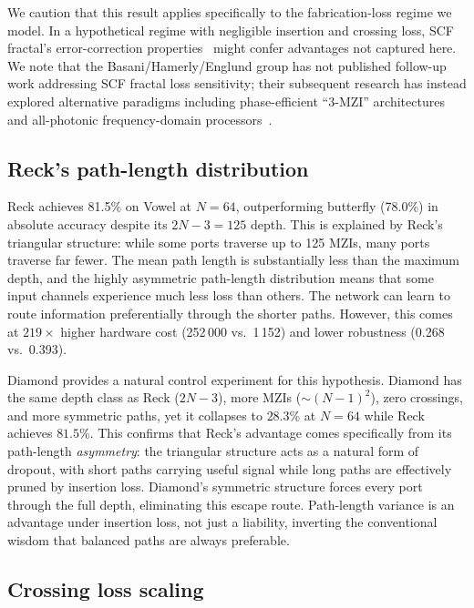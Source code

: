 \documentclass[11pt,a4paper]{article}
\begin{document}
We caution that this result applies specifically to the fabrication-loss regime
we model.  In a hypothetical regime with negligible insertion and crossing loss,
SCF fractal's error-correction properties~\cite{basani2023} might confer
advantages not captured here.
We note that the Basani/\allowbreak{}Hamerly/\allowbreak{}Englund group has not
published follow-up work addressing SCF fractal loss sensitivity; their
subsequent research has instead
explored alternative paradigms including phase-efficient ``3-MZI''
architectures~\cite{hamerly2025} and all-photonic frequency-domain
processors~\cite{basani2024}.

\subsection{Reck's path-length distribution}

Reck achieves 81.5\% on Vowel at $N{=}64$, outperforming butterfly (78.0\%)
in absolute accuracy despite its $2N{-}3 = 125$ depth.  This is explained by
Reck's triangular structure: while some ports traverse up to 125 MZIs, many
ports traverse far fewer.  The mean path length is substantially less than the
maximum depth, and the highly asymmetric path-length distribution means that
some input channels experience much less loss than others.  The network can
learn to route information preferentially through the shorter paths.  However,
this comes at $219\times$ higher hardware cost (252\,000 vs.\ 1\,152) and lower
robustness (0.268 vs.\ 0.393).

Diamond provides a natural control experiment for this hypothesis.  Diamond
has the same depth class as Reck ($2N{-}3$), more MZIs (${\sim}(N{-}1)^2$),
zero crossings, and more symmetric paths, yet it collapses to $28.3$\% at
$N{=}64$ while Reck achieves $81.5$\%.  This confirms that Reck's advantage
comes specifically from its path-length \emph{asymmetry}: the triangular
structure acts as a natural form of dropout, with short paths carrying useful
signal while long paths are effectively pruned by insertion loss.  Diamond's
symmetric structure forces every port through the full depth, eliminating this
escape route.  Path-length variance is an advantage under insertion loss, not
just a liability, inverting the conventional wisdom that balanced paths are
always preferable.

\subsection{Crossing loss scaling}
\end{document}
